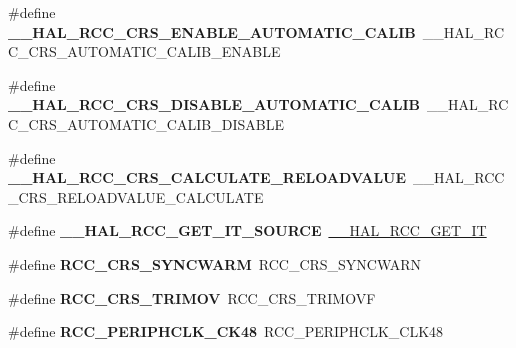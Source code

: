 \begin{DoxyCompactItemize}
\#define {\bfseries \+\_\+\+\_\+\+H\+A\+L\+\_\+\+R\+C\+C\+\_\+\+C\+R\+S\+\_\+\+E\+N\+A\+B\+L\+E\+\_\+\+A\+U\+T\+O\+M\+A\+T\+I\+C\+\_\+\+C\+A\+L\+IB}~\+\_\+\+\_\+\+H\+A\+L\+\_\+\+R\+C\+C\+\_\+\+C\+R\+S\+\_\+\+A\+U\+T\+O\+M\+A\+T\+I\+C\+\_\+\+C\+A\+L\+I\+B\+\_\+\+E\+N\+A\+B\+LE
\item 
\mbox{\label{group___h_a_l___r_c_c___aliased_ga1a09d18c05bd1f6fbbd78ffaecc3d96f}} 
\#define {\bfseries \+\_\+\+\_\+\+H\+A\+L\+\_\+\+R\+C\+C\+\_\+\+C\+R\+S\+\_\+\+D\+I\+S\+A\+B\+L\+E\+\_\+\+A\+U\+T\+O\+M\+A\+T\+I\+C\+\_\+\+C\+A\+L\+IB}~\+\_\+\+\_\+\+H\+A\+L\+\_\+\+R\+C\+C\+\_\+\+C\+R\+S\+\_\+\+A\+U\+T\+O\+M\+A\+T\+I\+C\+\_\+\+C\+A\+L\+I\+B\+\_\+\+D\+I\+S\+A\+B\+LE
\item 
\mbox{\label{group___h_a_l___r_c_c___aliased_ga116f9acbd5f6b61002ea1a6d3b17fdcd}} 
\#define {\bfseries \+\_\+\+\_\+\+H\+A\+L\+\_\+\+R\+C\+C\+\_\+\+C\+R\+S\+\_\+\+C\+A\+L\+C\+U\+L\+A\+T\+E\+\_\+\+R\+E\+L\+O\+A\+D\+V\+A\+L\+UE}~\+\_\+\+\_\+\+H\+A\+L\+\_\+\+R\+C\+C\+\_\+\+C\+R\+S\+\_\+\+R\+E\+L\+O\+A\+D\+V\+A\+L\+U\+E\+\_\+\+C\+A\+L\+C\+U\+L\+A\+TE
\item 
\mbox{\label{group___h_a_l___r_c_c___aliased_gabfda03424b7b180eec4bad4bf9c76799}} 
\#define {\bfseries \+\_\+\+\_\+\+H\+A\+L\+\_\+\+R\+C\+C\+\_\+\+G\+E\+T\+\_\+\+I\+T\+\_\+\+S\+O\+U\+R\+CE}~\mbox{\hyperlink{group___r_c_c___flags___interrupts___management_ga134af980b892f362c05ae21922cd828d}{\+\_\+\+\_\+\+H\+A\+L\+\_\+\+R\+C\+C\+\_\+\+G\+E\+T\+\_\+\+IT}}
\item 
\mbox{\label{group___h_a_l___r_c_c___aliased_ga891dba525c7131dc45cd727be5964a98}} 
\#define {\bfseries R\+C\+C\+\_\+\+C\+R\+S\+\_\+\+S\+Y\+N\+C\+W\+A\+RM}~R\+C\+C\+\_\+\+C\+R\+S\+\_\+\+S\+Y\+N\+C\+W\+A\+RN
\item 
\mbox{\label{group___h_a_l___r_c_c___aliased_ga52aafca9877f3acfca85b91fca0d0ac4}} 
\#define {\bfseries R\+C\+C\+\_\+\+C\+R\+S\+\_\+\+T\+R\+I\+M\+OV}~R\+C\+C\+\_\+\+C\+R\+S\+\_\+\+T\+R\+I\+M\+O\+VF
\item 
\mbox{\label{group___h_a_l___r_c_c___aliased_ga3ee6866f9d2349cd1a099407d2a7664b}} 
\#define {\bfseries R\+C\+C\+\_\+\+P\+E\+R\+I\+P\+H\+C\+L\+K\+\_\+\+C\+K48}~R\+C\+C\+\_\+\+P\+E\+R\+I\+P\+H\+C\+L\+K\+\_\+\+C\+L\+K48

\end{DoxyCompactItemize}
